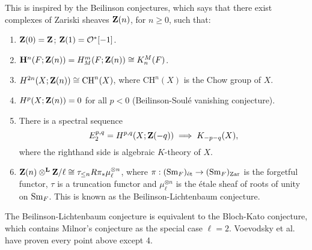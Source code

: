 This is inspired by the Beilinson conjectures, which says that there exist complexes of Zariski sheaves $\mathbf{Z}(n)$, for $n\ge0$, such that:
\begin{enumerate}
\item $\mathbf{Z}(0)=\mathbf{Z}$; $\mathbf{Z}(1)=\mathcal{O}^*[-1]$.
\item $\mathbf H^n(F;\mathbf{Z}(n))=H^m_M(F;\mathbf{Z}(n))\cong K_n^M(F)$.
\item $H^{2n}(X;\mathbf{Z}(n))\cong\text{CH}^n(X)$, where $\text{CH}^n(X)$ is the Chow group of $X$.
\item $H^p(X;\mathbf{Z}(n))=0$ for all $p<0$ (Beilinson-Soulé vanishing conjecture).
\item There is a spectral sequence
\[
E_2^{p,q}=H^{p,q}(X;\mathbf{Z}(-q))\implies K_{-p-q}(X),
\]where the righthand side is algebraic $K$-theory of $X$.
\item $\mathbf{Z}(n)\otimes^{\mathbf L} \mathbf{Z}/\ell\cong \tau_{\le n}R\pi_*\mu_\ell^{\otimes n}$, where $\pi:(\mathrm{Sm}_F)_{\text{ét}}\to(\mathrm{Sm}_F)_{\text{Zar}}$ is the forgetful functor, $\tau$ is a truncation functor and $\mu_\ell^{\otimes n}$ is the étale sheaf of roots of unity on $\mathrm{Sm}_F$. This is known as the Beilinson-Lichtenbaum conjecture.
\end{enumerate}
The Beilinson-Lichtenbaum conjecture is equivalent to the Bloch-Kato conjecture, which contains Milnor's conjecture as the special case $\ell=2$. Voevodsky et al. have proven every point above except 4.


















%
%

%